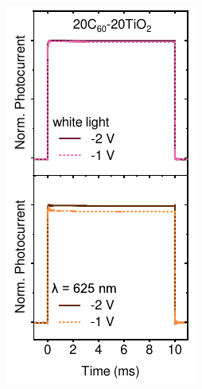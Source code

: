 \begin{figure}[htbp]
\begin{subfigure}{0.245\textwidth}
        \caption{}
        \label{}
    \end{subfigure}
    \hfill
    \begin{subfigure}{0.245\textwidth}
        \centering
        \includegraphics[width=\textwidth]{chapters/transport_layers/images/TPC_20_20.pdf}

\end{subfigure}
\end{figure}
